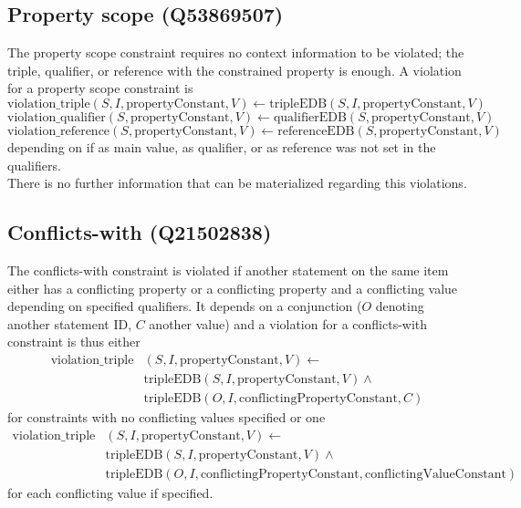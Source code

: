 \documentclass[hyperref,bachelorofscience,fleqn]{cgvpub}
\begin{document}
\subsection{Property scope (Q53869507)}
The property scope constraint requires no context information to be violated; the triple, qualifier, or reference with the constrained property is enough.
A violation for a property scope constraint is
\[\text{violation\_triple}(S, I, \text{propertyConstant}, V) \leftarrow \text{tripleEDB}(S, I, \text{propertyConstant}, V)\]
\[\text{violation\_qualifier}(S, \text{propertyConstant}, V) \leftarrow \text{qualifierEDB}(S, \text{propertyConstant}, V)\]
\[\text{violation\_reference}(S, \text{propertyConstant}, V) \leftarrow \text{referenceEDB}(S, \text{propertyConstant}, V)\]
depending on if as main value, as qualifier, or as reference was not set in the qualifiers.\\

There is no further information that can be materialized regarding this violations.

\subsection{Conflicts-with (Q21502838)}
The conflicts-with constraint is violated if another statement on the same item either has a conflicting property or a conflicting property and a conflicting value depending on specified qualifiers. It depends on a conjunction (\(O\) denoting another statement ID, \(C\) another value) and a violation for a conflicts-with constraint is thus either
\begin{equation*}
\begin{split}
\text{violation\_triple}&(S, I, \text{propertyConstant}, V) \leftarrow\\
&\text{tripleEDB}(S, I, \text{propertyConstant}, V) \wedge\\
&\text{tripleEDB}(O, I, \text{conflictingPropertyConstant}, C)
\end{split}
\end{equation*}
for constraints with no conflicting values specified or one
\begin{equation*}
\begin{split}
\text{violation\_triple}&(S, I, \text{propertyConstant}, V) \leftarrow\\
&\text{tripleEDB}(S, I, \text{propertyConstant}, V) \wedge\\
&\text{tripleEDB}(O, I, \text{conflictingPropertyConstant}, \text{conflictingValueConstant})
\end{split}
\end{equation*}
for each conflicting value if specified.\\
\end{document}
